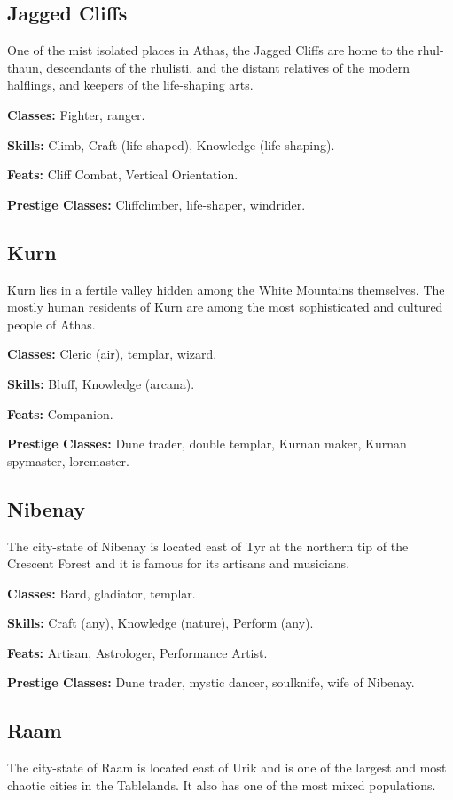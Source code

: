 \subsection{Jagged Cliffs}
One of the mist isolated places in Athas, the Jagged Cliffs are home to the rhul-thaun, descendants of the rhulisti, and the distant relatives of the modern halflings, and keepers of the life-shaping arts.

\textbf{Classes:} Fighter, ranger.

\textbf{Skills:} Climb, Craft (life-shaped), Knowledge (life-shaping).

\textbf{Feats:} Cliff Combat, Vertical Orientation.

\textbf{Prestige Classes:} Cliffclimber, life-shaper, windrider.


\subsection{Kurn}
Kurn lies in a fertile valley hidden among the White Mountains themselves. The mostly human residents of Kurn are among the most sophisticated and cultured people of Athas.

\textbf{Classes:} Cleric (air), templar, wizard.

\textbf{Skills:} Bluff, Knowledge (arcana).

\textbf{Feats:} Companion.

\textbf{Prestige Classes:} Dune trader, double templar, Kurnan maker, Kurnan spymaster, loremaster.

\subsection{Nibenay}
The city-state of Nibenay is located east of Tyr at the northern tip of the Crescent Forest and it is famous for its artisans and musicians.

\textbf{Classes:} Bard, gladiator, templar.

\textbf{Skills:} Craft (any), Knowledge (nature), Perform (any).

\textbf{Feats:} Artisan, Astrologer, Performance Artist.

\textbf{Prestige Classes:} Dune trader, mystic dancer, soulknife, wife of Nibenay.

\subsection{Raam}
The city-state of Raam is located east of Urik and is one of the largest and most chaotic cities in the Tablelands. It also has one of the most mixed populations.

